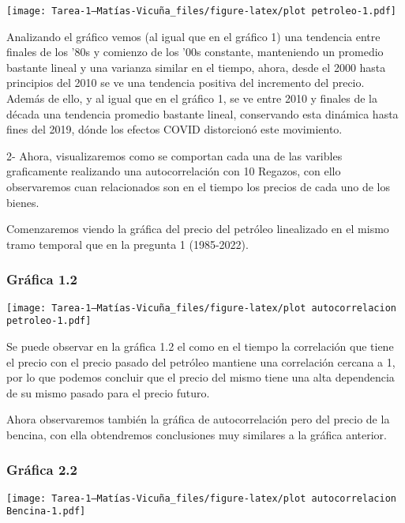 \documentclass[
]{article}
\begin{document}
\texttt{[image: Tarea-1---Matías-Vicuña\_files/figure-latex/plot petroleo-1.pdf]}

Analizando el gráfico vemos (al igual que en el gráfico 1) una tendencia
entre finales de los '80s y comienzo de los '00s constante, manteniendo
un promedio bastante lineal y una varianza similar en el tiempo, ahora,
desde el 2000 hasta principios del 2010 se ve una tendencia positiva del
incremento del precio. Además de ello, y al igual que en el gráfico 1,
se ve entre 2010 y finales de la década una tendencia promedio bastante
lineal, conservando esta dinámica hasta fines del 2019, dónde los
efectos COVID distorcionó este movimiento.

\newpage

2- Ahora, visualizaremos como se comportan cada una de las varibles
graficamente realizando una autocorrelación con 10 Regazos, con ello
observaremos cuan relacionados son en el tiempo los precios de cada uno
de los bienes.

Comenzaremos viendo la gráfica del precio del petróleo linealizado en el
mismo tramo temporal que en la pregunta 1 (1985-2022).

\hypertarget{gruxe1fica-1.2}{%
\subsubsection{Gráfica 1.2}\label{gruxe1fica-1.2}}

\texttt{[image: Tarea-1---Matías-Vicuña\_files/figure-latex/plot autocorrelacion petroleo-1.pdf]}

Se puede observar en la gráfica 1.2 el como en el tiempo la correlación
que tiene el precio con el precio pasado del petróleo mantiene una
correlación cercana a 1, por lo que podemos concluir que el precio del
mismo tiene una alta dependencia de su mismo pasado para el precio
futuro.

Ahora observaremos también la gráfica de autocorrelación pero del precio
de la bencina, con ella obtendremos conclusiones muy similares a la
gráfica anterior.

\hypertarget{gruxe1fica-2.2}{%
\subsubsection{Gráfica 2.2}\label{gruxe1fica-2.2}}

\texttt{[image: Tarea-1---Matías-Vicuña\_files/figure-latex/plot autocorrelacion Bencina-1.pdf]}

\newpage
\end{document}
